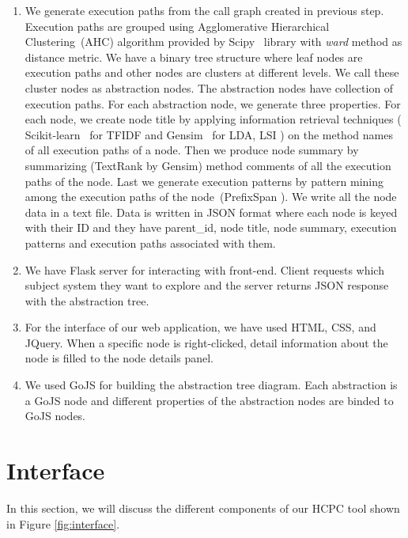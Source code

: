 \begin{enumerate}
    \item We generate execution paths from the call graph created in previous step.
Execution paths are grouped using Agglomerative Hierarchical Clustering~(AHC) algorithm provided by Scipy~\cite{scipy} library with \emph{ward} method as distance metric. We have a binary tree structure where leaf nodes are execution paths and other nodes are clusters at different levels. We call these cluster nodes as abstraction nodes. The abstraction nodes have collection of execution paths. For each abstraction node, we generate three properties. For each node, we create node title by applying information retrieval techniques ( Scikit-learn~\cite{scikit-learn} for TFIDF and Gensim~\cite{gensim} for LDA, LSI ) on the method names of all execution paths of a node. Then we produce node summary by summarizing (TextRank by Gensim) method comments of all the execution paths of the node. Last we generate execution patterns by pattern mining among the execution paths of the node~(PrefixSpan \cite{prefixspan}). We write all the node data in a text file. Data is written in JSON format where each node is keyed with their ID and they have parent\_id, node title, node summary, execution patterns and execution paths associated with them. 
    \item We have Flask server for interacting with front-end. Client requests which subject system they want to explore and the server returns JSON response with the abstraction tree. 
    \item For the interface of our web application, we have used HTML, CSS, and JQuery. When a specific node is right-clicked, detail information about the node is filled to the node details panel.
    \item We used GoJS for building the abstraction tree diagram. Each abstraction  is a GoJS node and different properties of the abstraction nodes are binded to GoJS nodes. 

\end{enumerate}


\section{Interface}
\label{hla3:interface}
In this section, we will discuss the different components of our HCPC tool shown in Figure \ref{fig:interface}.

